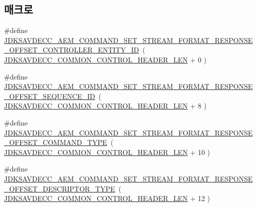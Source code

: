 \subsection*{매크로}
\begin{DoxyCompactItemize}
\item 
\#define \hyperlink{group__command__set__stream__format__response_ga45fd001ea1cc2c6a632e66a9cccca09a}{J\+D\+K\+S\+A\+V\+D\+E\+C\+C\+\_\+\+A\+E\+M\+\_\+\+C\+O\+M\+M\+A\+N\+D\+\_\+\+S\+E\+T\+\_\+\+S\+T\+R\+E\+A\+M\+\_\+\+F\+O\+R\+M\+A\+T\+\_\+\+R\+E\+S\+P\+O\+N\+S\+E\+\_\+\+O\+F\+F\+S\+E\+T\+\_\+\+C\+O\+N\+T\+R\+O\+L\+L\+E\+R\+\_\+\+E\+N\+T\+I\+T\+Y\+\_\+\+ID}~( \hyperlink{group__jdksavdecc__avtp__common__control__header_gaae84052886fb1bb42f3bc5f85b741dff}{J\+D\+K\+S\+A\+V\+D\+E\+C\+C\+\_\+\+C\+O\+M\+M\+O\+N\+\_\+\+C\+O\+N\+T\+R\+O\+L\+\_\+\+H\+E\+A\+D\+E\+R\+\_\+\+L\+EN} + 0 )
\item 
\#define \hyperlink{group__command__set__stream__format__response_ga51546bff089258de7a8780ebf95184ea}{J\+D\+K\+S\+A\+V\+D\+E\+C\+C\+\_\+\+A\+E\+M\+\_\+\+C\+O\+M\+M\+A\+N\+D\+\_\+\+S\+E\+T\+\_\+\+S\+T\+R\+E\+A\+M\+\_\+\+F\+O\+R\+M\+A\+T\+\_\+\+R\+E\+S\+P\+O\+N\+S\+E\+\_\+\+O\+F\+F\+S\+E\+T\+\_\+\+S\+E\+Q\+U\+E\+N\+C\+E\+\_\+\+ID}~( \hyperlink{group__jdksavdecc__avtp__common__control__header_gaae84052886fb1bb42f3bc5f85b741dff}{J\+D\+K\+S\+A\+V\+D\+E\+C\+C\+\_\+\+C\+O\+M\+M\+O\+N\+\_\+\+C\+O\+N\+T\+R\+O\+L\+\_\+\+H\+E\+A\+D\+E\+R\+\_\+\+L\+EN} + 8 )
\item 
\#define \hyperlink{group__command__set__stream__format__response_gae76cbf087e2e7505bc3a4e455a4ece13}{J\+D\+K\+S\+A\+V\+D\+E\+C\+C\+\_\+\+A\+E\+M\+\_\+\+C\+O\+M\+M\+A\+N\+D\+\_\+\+S\+E\+T\+\_\+\+S\+T\+R\+E\+A\+M\+\_\+\+F\+O\+R\+M\+A\+T\+\_\+\+R\+E\+S\+P\+O\+N\+S\+E\+\_\+\+O\+F\+F\+S\+E\+T\+\_\+\+C\+O\+M\+M\+A\+N\+D\+\_\+\+T\+Y\+PE}~( \hyperlink{group__jdksavdecc__avtp__common__control__header_gaae84052886fb1bb42f3bc5f85b741dff}{J\+D\+K\+S\+A\+V\+D\+E\+C\+C\+\_\+\+C\+O\+M\+M\+O\+N\+\_\+\+C\+O\+N\+T\+R\+O\+L\+\_\+\+H\+E\+A\+D\+E\+R\+\_\+\+L\+EN} + 10 )
\item 
\#define \hyperlink{group__command__set__stream__format__response_ga9cdb24efcf82b23e77a55a6feb53cb99}{J\+D\+K\+S\+A\+V\+D\+E\+C\+C\+\_\+\+A\+E\+M\+\_\+\+C\+O\+M\+M\+A\+N\+D\+\_\+\+S\+E\+T\+\_\+\+S\+T\+R\+E\+A\+M\+\_\+\+F\+O\+R\+M\+A\+T\+\_\+\+R\+E\+S\+P\+O\+N\+S\+E\+\_\+\+O\+F\+F\+S\+E\+T\+\_\+\+D\+E\+S\+C\+R\+I\+P\+T\+O\+R\+\_\+\+T\+Y\+PE}~( \hyperlink{group__jdksavdecc__avtp__common__control__header_gaae84052886fb1bb42f3bc5f85b741dff}{J\+D\+K\+S\+A\+V\+D\+E\+C\+C\+\_\+\+C\+O\+M\+M\+O\+N\+\_\+\+C\+O\+N\+T\+R\+O\+L\+\_\+\+H\+E\+A\+D\+E\+R\+\_\+\+L\+EN} + 12 )

\end{DoxyCompactItemize}
